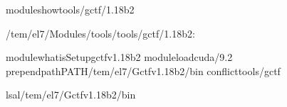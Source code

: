 \documentclass[a4paper,10pt,english]{sphinxmanual}
\begin{document}
\begin{sphinxVerbatim}[commandchars=\\\{\}]
\PYGZdl{}\PYGZgt{}moduleshowtools/gctf/1.18\PYGZus{}b2

\PYGZhy{}\PYGZhy{}\PYGZhy{}\PYGZhy{}\PYGZhy{}\PYGZhy{}\PYGZhy{}\PYGZhy{}\PYGZhy{}\PYGZhy{}\PYGZhy{}\PYGZhy{}\PYGZhy{}\PYGZhy{}\PYGZhy{}\PYGZhy{}\PYGZhy{}\PYGZhy{}\PYGZhy{}\PYGZhy{}\PYGZhy{}\PYGZhy{}\PYGZhy{}\PYGZhy{}\PYGZhy{}\PYGZhy{}\PYGZhy{}\PYGZhy{}\PYGZhy{}\PYGZhy{}\PYGZhy{}\PYGZhy{}\PYGZhy{}\PYGZhy{}\PYGZhy{}\PYGZhy{}\PYGZhy{}\PYGZhy{}\PYGZhy{}\PYGZhy{}\PYGZhy{}\PYGZhy{}\PYGZhy{}\PYGZhy{}\PYGZhy{}\PYGZhy{}\PYGZhy{}\PYGZhy{}\PYGZhy{}\PYGZhy{}\PYGZhy{}\PYGZhy{}\PYGZhy{}\PYGZhy{}\PYGZhy{}\PYGZhy{}\PYGZhy{}\PYGZhy{}\PYGZhy{}\PYGZhy{}\PYGZhy{}\PYGZhy{}\PYGZhy{}\PYGZhy{}\PYGZhy{}\PYGZhy{}\PYGZhy{}
/tem/el7/Modules/tools/tools/gctf/1.18\PYGZus{}b2:

module\PYGZhy{}whatisSetupgctfv1.18\PYGZus{}b2
moduleloadcuda/9.2
prepend\PYGZhy{}pathPATH/tem/el7/Gctf\PYGZus{}v1.18\PYGZus{}b2/bin
conflicttools/gctf
\PYGZhy{}\PYGZhy{}\PYGZhy{}\PYGZhy{}\PYGZhy{}\PYGZhy{}\PYGZhy{}\PYGZhy{}\PYGZhy{}\PYGZhy{}\PYGZhy{}\PYGZhy{}\PYGZhy{}\PYGZhy{}\PYGZhy{}\PYGZhy{}\PYGZhy{}\PYGZhy{}\PYGZhy{}\PYGZhy{}\PYGZhy{}\PYGZhy{}\PYGZhy{}\PYGZhy{}\PYGZhy{}\PYGZhy{}\PYGZhy{}\PYGZhy{}\PYGZhy{}\PYGZhy{}\PYGZhy{}\PYGZhy{}\PYGZhy{}\PYGZhy{}\PYGZhy{}\PYGZhy{}\PYGZhy{}\PYGZhy{}\PYGZhy{}\PYGZhy{}\PYGZhy{}\PYGZhy{}\PYGZhy{}\PYGZhy{}\PYGZhy{}\PYGZhy{}\PYGZhy{}\PYGZhy{}\PYGZhy{}\PYGZhy{}\PYGZhy{}\PYGZhy{}\PYGZhy{}\PYGZhy{}\PYGZhy{}\PYGZhy{}\PYGZhy{}\PYGZhy{}\PYGZhy{}\PYGZhy{}\PYGZhy{}\PYGZhy{}\PYGZhy{}\PYGZhy{}\PYGZhy{}\PYGZhy{}\PYGZhy{}


\PYGZdl{}\PYGZgt{}ls\PYGZhy{}al/tem/el7/Gctf\PYGZus{}v1.18\PYGZus{}b2/bin


\end{sphinxVerbatim}
\end{document}
